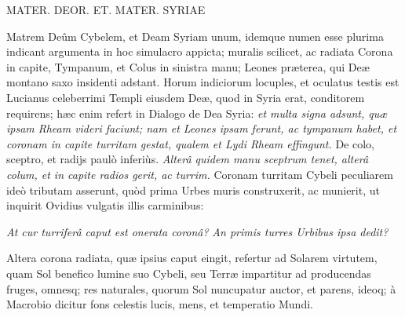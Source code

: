 \documentclass[a4paper, 11pt, oneside, polutonikogreek, latin]{article}
\begin{document}
MATER. DEOR. ET. MATER. SYRIAE

Matrem Deûm Cybelem, et Deam Syriam unum, idemque numen esse plurima indicant argumenta in hoc simulacro appicta; muralis scilicet, ac radiata Corona in capite, Tympanum, et Colus in sinistra manu; Leones præterea, qui Deæ montano saxo insidenti adstant. Horum indiciorum locuples, et oculatus testis est Lucianus celeberrimi Templi eiusdem Deæ, quod in Syria erat, conditorem requirens; hæc enim refert in Dialogo de Dea Syria: \emph{et multa signa adsunt, quæ ipsam Rheam videri faciunt; nam et Leones ipsam ferunt, ac tympanum habet, et coronam in capite turritam gestat, qualem et Lydi Rheam effingunt.} De colo, sceptro, et radijs paulò inferiùs. \emph{Alterâ quidem manu sceptrum tenet, alterâ colum, et in capite radios gerit, ac turrim.} Coronam turritam Cybeli peculiarem ideò tributam asserunt, quòd prima Urbes muris construxerit, ac munierit, ut inquirit Ovidius vulgatis illis carminibus:

\emph{At cur turriferâ caput est onerata coronâ?}
\emph{An primis turres Urbibus ipsa dedit?}

Altera corona radiata, quæ ipsius caput eingit, refertur ad Solarem virtutem, quam Sol benefico lumine suo Cybeli, seu Terræ impartitur ad producendas fruges, omnesq; res naturales, quorum Sol nuncupatur auctor, et parens, ideoq; à Macrobio dicitur fons celestis lucis, mens, et temperatio Mundi.
\end{document}

